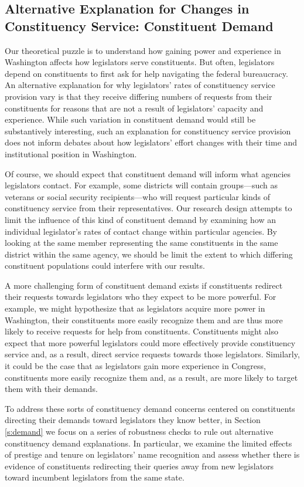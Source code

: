 \documentclass[12pt]{article}
\begin{document}
\subsection{Alternative Explanation for Changes in Constituency Service: Constituent Demand}

Our theoretical puzzle is to understand how gaining power and experience in Washington affects how legislators serve constituents. But often, legislators depend on constituents to first ask for help navigating the federal bureaucracy. An alternative explanation for why legislators' rates of constituency service provision vary is that they receive differing numbers of requests from their constituents for reasons that are not a result of legislators' capacity and experience. While such variation in constituent demand would still be substantively interesting, such an explanation for constituency service provision does not inform debates about how legislators' effort changes with their time and institutional position in Washington. 

Of course, we should expect that constituent demand will inform what agencies legislators contact. For example, some districts will contain groups---such as veterans or social security recipients---who will request particular kinds of constituency service from their representatives. Our research design attempts to limit the influence of this kind of constituent demand by examining how an individual legislator's rates of contact change within particular agencies. By looking at the same member representing the same constituents in the same district within the same agency, we should be limit the extent to which differing constituent populations could interfere with our results. 

A more challenging form of constituent demand exists if constituents redirect their requests towards legislators who they expect to be more powerful. For example, we might hypothesize that as legislators acquire more power in Washington, their constituents more easily recognize them and are thus more likely to receive requests for help from constituents. Constituents might also expect that more powerful legislators could more effectively provide constituency service and, as a result, direct service requests towards those legislators. Similarly, it could be the case that as legislators gain more experience in Congress, constituents more easily recognize them and, as a result, are more likely to target them with their demands. 

To address these sorts of constituency demand concerns centered on constituents directing their demands toward legislators they know better, in Section \ref{s:demand} we focus on a series of robustness checks to rule out alternative constituency demand explanations. In particular, we examine the limited effects of prestige and tenure on legislators' name recognition and assess whether there is evidence of constituents redirecting their queries away from new legislators toward incumbent legislators from the same state. 
\end{document}
